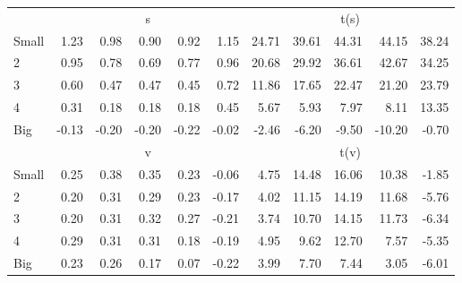 \begin{table}[!ht]
\begin{tabular}{lrrrrrrrrrr}
      & \multicolumn{5}{c}{s} & \multicolumn{5}{c}{t(s)}
    
    \\
      \cmidrule(r){2-6} \cmidrule(r){7-11}

    Small   & 1.23  & 0.98  & 0.90  & 0.92  & 1.15  & 24.71  & 39.61  & 44.31  & 44.15  & 38.24  \\
         2  & 0.95  & 0.78  & 0.69  & 0.77  & 0.96  & 20.68  & 29.92  & 36.61  & 42.67  & 34.25  \\
         3  & 0.60  & 0.47  & 0.47  & 0.45  & 0.72  & 11.86  & 17.65  & 22.47  & 21.20  & 23.79  \\
         4  & 0.31  & 0.18  & 0.18  & 0.18  & 0.45  & 5.67  & 5.93  & 7.97  & 8.11  & 13.35  \\
    Big     & -0.13  & -0.20  & -0.20  & -0.22  & -0.02  & -2.46  & -6.20  & -9.50  & -10.20  & -0.70  \\

  
    
      & \multicolumn{5}{c}{v} & \multicolumn{5}{c}{t(v)}
    
    \\
      \cmidrule(r){2-6} \cmidrule(r){7-11}

    Small   & 0.25  & 0.38  & 0.35  & 0.23  & -0.06  & 4.75  & 14.48  & 16.06  & 10.38  & -1.85  \\
         2  & 0.20  & 0.31  & 0.29  & 0.23  & -0.17  & 4.02  & 11.15  & 14.19  & 11.68  & -5.76  \\
         3  & 0.20  & 0.31  & 0.32  & 0.27  & -0.21  & 3.74  & 10.70  & 14.15  & 11.73  & -6.34  \\
         4  & 0.29  & 0.31  & 0.31  & 0.18  & -0.19  & 4.95  & 9.62  & 12.70  & 7.57  & -5.35  \\
    Big     & 0.23  & 0.26  & 0.17  & 0.07  & -0.22  & 3.99  & 7.70  & 7.44  & 3.05  & -6.01  \\

  

  \bottomrule
\end{tabular}
\label{tbl:25_Size_Prior_F93}
\end{table}